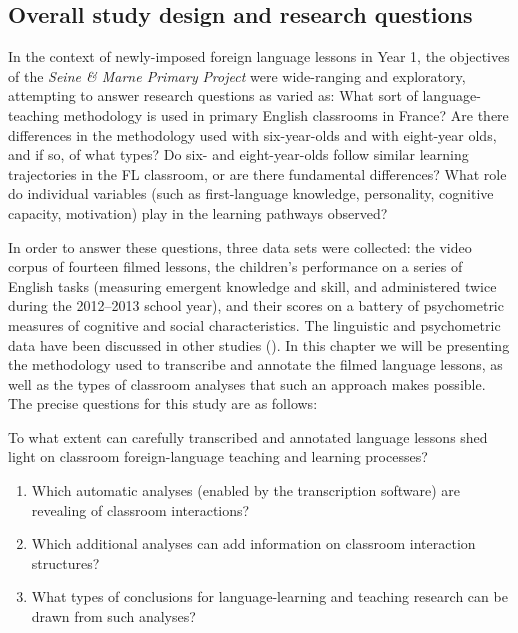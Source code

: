 \documentclass[output=paper,colorlinks,citecolor=brown,modfonts,nonflat]{../langscibook}
\begin{document}
\subsection{Overall study design and research questions}

In the context of newly-imposed foreign language lessons in Year 1, the objectives of the \textit{Seine \& Marne Primary} \textit{Project} were wide-ranging and exploratory, attempting to answer research questions as varied as: What sort of language-teaching methodology is used in primary English classrooms in France? Are there differences in the methodology used with six-year-olds and with eight-year olds, and if so, of what types? Do six- and eight-year-olds follow similar learning trajectories in the FL classroom, or are there fundamental differences? What role do individual variables (such as first-language knowledge, personality, cognitive capacity, motivation) play in the learning pathways observed? 

In order to answer these questions, three data sets were collected: the video corpus of fourteen filmed lessons, the children’s performance on a series of English tasks (measuring emergent knowledge and skill, and administered twice during the 2012--2013 school year), and their scores on a battery of psychometric measures of cognitive and social characteristics. The linguistic and psychometric data have been discussed in other studies (\citealt{HiltonRoyer2014, HiltonEtAl2016, Hilton2017}). In this chapter we will be presenting the methodology used to transcribe and annotate the filmed language lessons, as well as the types of classroom analyses that such an approach makes possible. The precise questions for this study are as follows:

To what extent can carefully transcribed and annotated language lessons shed light on classroom foreign-language teaching and learning processes?

\begin{enumerate}
\item Which automatic analyses (enabled by the transcription software) are revealing of classroom interactions?
\item Which additional analyses can add information on classroom interaction structures?
\item What types of conclusions for language-learning and teaching research can be drawn from such analyses?
\end{enumerate}
\end{document}
